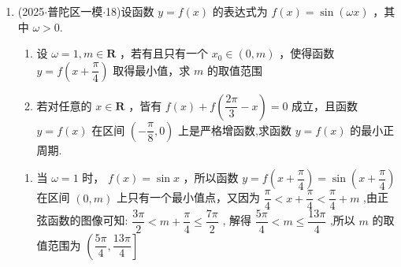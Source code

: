 \begin{enumerate}
\begin{jieda}
\begin{enumerate}
            \item 因为 $f\left( A\right)  = f\left( B\right)$ ，又 $0 < A + B < \pi$ ，结合图像对称性可知: $A + B = \dfrac{2\pi }{3}$ ,则 $C = \dfrac{\pi }{3}$ ,又 $c = 2$ ,由正弦定理得: $\dfrac{a}{\sin A} =  \dfrac{b}{\sin B} = \dfrac{c}{\sin C} = \dfrac{4\sqrt{3}}{3}$ ,则 $a = \dfrac{4\sqrt{3}}{3}\sin A,b = \dfrac{4\sqrt{3}}{3}\sin B$ ,所以 ${ab} = \dfrac{16}{3}\sin A\sin B = \dfrac{16}{3}\sin A\sin \left( {\dfrac{2\pi }{3} - A}\right)  = \dfrac{16}{3}\sin A\left( {\dfrac{\sqrt{3}}{2}\cos A + }\right.  \left. {\dfrac{1}{2}\sin A}\right)  = \dfrac{8\sqrt{3}}{3}\sin A\cos A + \dfrac{8}{3}{\sin }^{2}A = \dfrac{4\sqrt{3}}{3}\sin {2A} + \dfrac{4}{3} -  \dfrac{4}{3}\cos {2A} = \dfrac{8}{3}\sin \left( {{2A} - \dfrac{\pi }{6}}\right)  + \dfrac{4}{3}$ ,由 $A + B = \dfrac{2\pi }{3},A \neq  B$ ,可得 $A \in  \left( {0,\dfrac{\pi }{3}}\right)  \cup  \left( {\dfrac{\pi }{3},\dfrac{2\pi }{3}}\right)$ ,所以 ${2A} - \dfrac{\pi }{6} \in  \left( {-\dfrac{\pi }{6},\dfrac{\pi }{2}}\right)  \cup  \left( \dfrac{\pi }{2}, \dfrac{7\pi }{6}\right)$ ,则 $\sin \left( {{2A} - \dfrac{\pi }{6}}\right)  \in  \left( {-\dfrac{1}{2},1}\right)$ ,故 ${ab} \in  \left( {0,4}\right)$ ,于是可得 $\bigtriangleup {ABC}$ 的面积为 $\dfrac{1}{2}{ab}\sin C = \dfrac{1}{2}{ab} \cdot  \dfrac{\sqrt{3}}{2} = \dfrac{\sqrt{3}}{4}{ab} \in  \left( {0,\sqrt{3}}\right)$ , 故 $\bigtriangleup {ABC}$ 面积的取值范围为 $\left( {0,\sqrt{3}}\right)$.
        \end{enumerate}
    \end{jieda}

    \item (2025$\cdot$普陀区一模$\cdot$18)设函数 $y = f\left( x\right)$ 的表达式为 $f\left( x\right)  = \sin \left( {\omega x}\right)$ ，其中 $\omega  > 0$.
    \begin{enumerate}
        \item 设 $\omega  = 1,m \in  \mathbf{R}$ ，若有且只有一个 ${x}_{0} \in  \left( {0,m}\right)$ ，使得函数 $y = f\left( {x + \dfrac{\pi }{4}}\right)$ 取得最小值，求 $m$ 的取值范围
        \item 若对任意的 $x \in  \mathbf{R}$ ，皆有 $f\left( x\right)  + f\left( {\dfrac{2\pi }{3} - x}\right)  = 0$ 成立，且函数 $y = f\left( x\right)$ 在区间 $\left( {-\dfrac{\pi }{8},0}\right)$ 上是严格增函数,求函数 $y = f\left( x\right)$ 的最小正周期.
    \end{enumerate}
    \begin{jieda}
        \begin{enumerate}
            \item 当 $\omega  = 1$ 时， $f\left( x\right)  = \sin x$ ，所以函数 $y = f\left( {x + \dfrac{\pi }{4}}\right)  =  \sin \left( {x + \dfrac{\pi }{4}}\right)$ 在区间 $\left( {0,m}\right)$ 上只有一个最小值点，又因为 $\dfrac{\pi }{4} <  x + \dfrac{\pi }{4} < \dfrac{\pi }{4} + m$ ,由正弦函数的图像可知: $\dfrac{3\pi }{2} < m + \dfrac{\pi }{4} \leq  \dfrac{7\pi }{2}$ , 解得 $\dfrac{5\pi }{4} < m \leq  \dfrac{13\pi }{4}$ ,所以 $m$ 的取值范围为 $\left( {\dfrac{5\pi }{4},\dfrac{13\pi }{4}}\right\rbrack$ 
            

\end{enumerate}
\end{jieda}
\end{enumerate}
